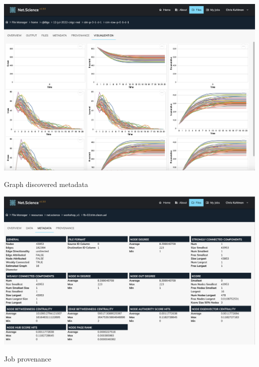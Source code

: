 \documentclass[landscape,paperwidth=70in,paperheight=46in,fontscale=0.225]{baposter} %
\begin{document}
\begin{poster}
{\begin{minipage}{0.3\linewidth}
\includegraphics[scale=0.07]{figures/sim_results_pallet} 
\end{minipage}
\hspace{0.1in}
\begin{minipage}{0.3\linewidth}

Graph discovered metadata

\includegraphics[scale=0.06]{figures/graph_discovered_metadata.png} 
\end{minipage}
\hspace{0.1in}
\begin{minipage}{0.3\linewidth}

Job provenance


\end{minipage}}
\end{poster}
\end{document}
